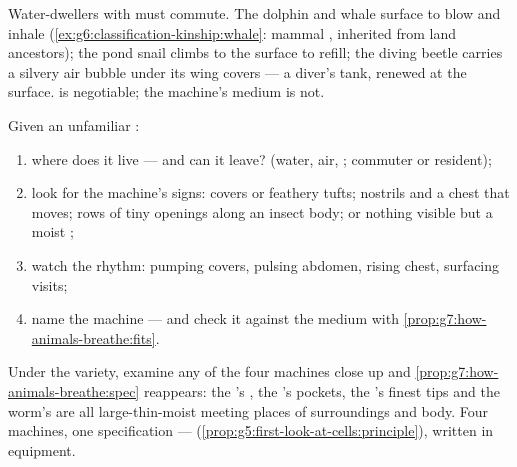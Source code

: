 \begin{example}\label{ex:g7:how-animals-breathe:airinwater}
Water-dwellers with  must commute. The dolphin and
whale surface to blow and inhale
(\cref{ex:g6:classification-kinship:whale}: mammal ,
inherited from land ancestors); the pond snail climbs to
the surface to refill; the diving beetle carries a silvery
air bubble under its wing covers --- a diver's tank,
renewed at the surface.  is negotiable; the
machine's medium is not.
\end{example}

\begin{method}\label{met:g7:how-animals-breathe:read}
Given an unfamiliar :
\begin{enumerate}
  \item where does it live --- and can it leave? (water,
        air, ; commuter or resident);
  \item look for the machine's signs:  covers or
        feathery tufts; nostrils and a chest that moves;
        rows of tiny openings along an insect body; or
        nothing visible but a moist ;
  \item watch the rhythm: pumping covers, pulsing abdomen,
        rising chest, surfacing visits;
  \item name the machine --- and check it against the
        medium with
        \cref{prop:g7:how-animals-breathe:fits}.
\end{enumerate}
\end{method}

\begin{remark}\label{rem:g7:how-animals-breathe:same}
Under the variety, examine any of the four machines close
up and \cref{prop:g7:how-animals-breathe:spec} reappears:
the 's , the 's pockets, the 's
finest tips and the worm's  are all large-thin-moist
meeting places of surroundings and body. Four machines,
one specification --- 
(\cref{prop:g5:first-look-at-cells:principle}), written in
 equipment.
\end{remark}

